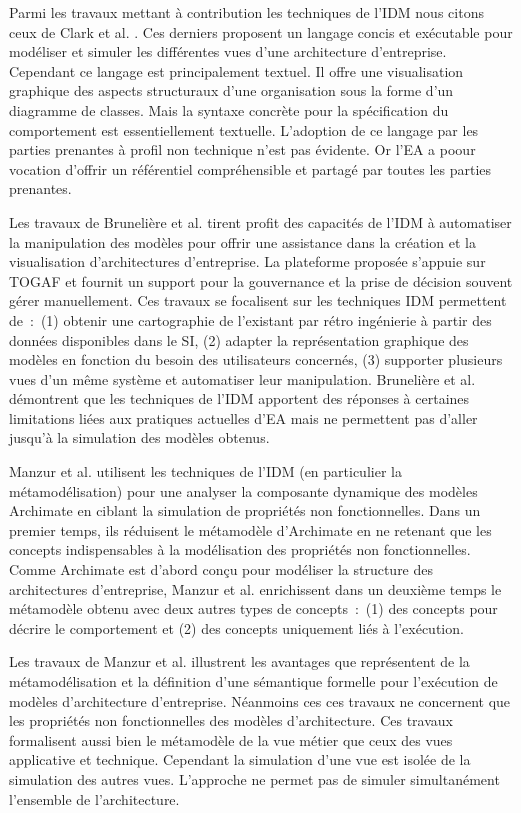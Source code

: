 Parmi les travaux mettant à contribution les techniques de l'IDM nous citons ceux de Clark et al. \cite{clark2011leap}. Ces derniers proposent un langage concis et exécutable pour modéliser et simuler les différentes vues d'une architecture d'entreprise. Cependant ce langage est principalement textuel. Il offre une visualisation graphique des aspects structuraux d'une organisation sous la forme d'un diagramme de classes. Mais la syntaxe concrète pour la spécification du comportement est essentiellement textuelle. L'adoption de ce langage par les parties prenantes à profil non technique n'est pas évidente. Or l'EA a poour vocation d'offrir un référentiel compréhensible et partagé par toutes les parties prenantes.

Les travaux de Brunelière et al. \cite{bruneliere2013mde} tirent profit des capacités de l'IDM à automatiser la manipulation des modèles pour offrir une assistance dans la création et la visualisation d'architectures d'entreprise. La plateforme proposée s'appuie sur TOGAF et fournit un support pour la gouvernance et la prise de décision souvent gérer manuellement. Ces travaux se focalisent sur les techniques IDM permettent de~:~(1) obtenir une cartographie de l'existant par rétro ingénierie à partir des données disponibles dans le SI, (2) adapter la représentation graphique des modèles en fonction du besoin des utilisateurs concernés, (3) supporter plusieurs vues d'un même système et automatiser leur manipulation. Brunelière et al. \cite{bruneliere2013mde} démontrent que les techniques de l'IDM apportent des réponses à certaines limitations liées aux pratiques actuelles d'EA mais ne permettent pas d'aller jusqu'à la simulation des modèles obtenus. 

Manzur et al. \cite{manzur2015xarchimate} utilisent les techniques de l'IDM (en particulier la métamodélisation) pour une analyser la composante dynamique des modèles Archimate en ciblant la simulation de propriétés non fonctionnelles. Dans un premier temps, ils réduisent le métamodèle  d'Archimate en ne retenant que les concepts indispensables à la modélisation des propriétés non fonctionnelles. Comme Archimate est d'abord conçu pour modéliser la structure des architectures d'entreprise, Manzur et al. \cite{manzur2015xarchimate} enrichissent dans un deuxième temps le métamodèle obtenu avec deux autres types de concepts~:~(1) des concepts pour décrire le comportement et (2) des concepts uniquement liés à l'exécution. 

Les travaux de Manzur et al. \cite{manzur2015xarchimate} illustrent les avantages que représentent de la métamodélisation et la définition d'une sémantique formelle pour l'exécution de modèles d'architecture d'entreprise. Néanmoins ces ces travaux ne concernent que les propriétés non fonctionnelles des modèles d'architecture. Ces travaux formalisent aussi bien le métamodèle de la vue métier  que ceux des vues applicative et technique. Cependant la simulation d'une vue est isolée de la simulation des autres vues. L'approche ne permet pas de simuler simultanément l'ensemble de l'architecture. 


